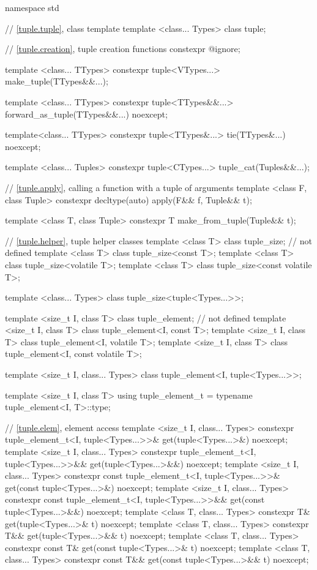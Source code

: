 %
%
\begin{codeblock}
namespace std {
  // \ref{tuple.tuple}, class template 
  template <class... Types>
    class tuple;

  // \ref{tuple.creation}, tuple creation functions
  constexpr @\unspec@ ignore;

  template <class... TTypes>
    constexpr tuple<VTypes...> make_tuple(TTypes&&...);

  template <class... TTypes>
    constexpr tuple<TTypes&&...> forward_as_tuple(TTypes&&...) noexcept;

  template<class... TTypes>
    constexpr tuple<TTypes&...> tie(TTypes&...) noexcept;

  template <class... Tuples>
    constexpr tuple<CTypes...> tuple_cat(Tuples&&...);

  // \ref{tuple.apply}, calling a function with a tuple of arguments
  template <class F, class Tuple>
    constexpr decltype(auto) apply(F&& f, Tuple&& t);

  template <class T, class Tuple>
    constexpr T make_from_tuple(Tuple&& t);

  // \ref{tuple.helper}, tuple helper classes
  template <class T> class tuple_size;                  // not defined
  template <class T> class tuple_size<const T>;
  template <class T> class tuple_size<volatile T>;
  template <class T> class tuple_size<const volatile T>;

  template <class... Types> class tuple_size<tuple<Types...>>;

  template <size_t I, class T> class tuple_element;     // not defined
  template <size_t I, class T> class tuple_element<I, const T>;
  template <size_t I, class T> class tuple_element<I, volatile T>;
  template <size_t I, class T> class tuple_element<I, const volatile T>;

  template <size_t I, class... Types>
    class tuple_element<I, tuple<Types...>>;

  template <size_t I, class T>
    using tuple_element_t = typename tuple_element<I, T>::type;

  // \ref{tuple.elem}, element access
  template <size_t I, class... Types>
    constexpr tuple_element_t<I, tuple<Types...>>& get(tuple<Types...>&) noexcept;
  template <size_t I, class... Types>
    constexpr tuple_element_t<I, tuple<Types...>>&& get(tuple<Types...>&&) noexcept;
  template <size_t I, class... Types>
    constexpr const tuple_element_t<I, tuple<Types...>>& get(const tuple<Types...>&) noexcept;
  template <size_t I, class... Types>
    constexpr const tuple_element_t<I, tuple<Types...>>&& get(const tuple<Types...>&&) noexcept;
  template <class T, class... Types>
    constexpr T& get(tuple<Types...>& t) noexcept;
  template <class T, class... Types>
    constexpr T&& get(tuple<Types...>&& t) noexcept;
  template <class T, class... Types>
    constexpr const T& get(const tuple<Types...>& t) noexcept;
  template <class T, class... Types>
    constexpr const T&& get(const tuple<Types...>&& t) noexcept;

}
\end{codeblock}

